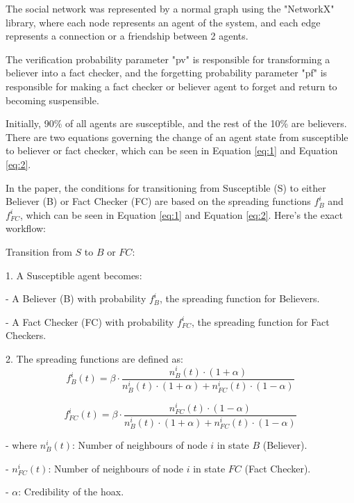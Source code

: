 \documentclass[twocolumn, a4paper, 12pt]{article}
\begin{document}
The social network was represented by a normal graph using the "NetworkX" library, where each node represents an agent of the system, and each edge represents a connection or a friendship between 2 agents.

The verification probability parameter "pv" is responsible for transforming a believer into a fact checker, and the forgetting probability parameter "pf" is responsible for making a fact checker or believer agent to forget and return to becoming suspensible.

Initially, 90\% of all agents are susceptible, and the rest of the 10\% are believers. There are two equations governing the change of an agent state from susceptible to believer or fact checker, which can be seen in Equation \ref{eq:1} and Equation \ref{eq:2}.

In the paper, the conditions for transitioning from Susceptible (S) to either Believer (B) or Fact Checker (FC) are based on the spreading functions $f_B^i$ and $f_{FC}^i$, which can be seen in Equation \ref{eq:1} and Equation \ref{eq:2}. \cite{simulation} Here's the exact workflow:

Transition from $S$ to $B$ or $FC$:

1. A Susceptible agent becomes:

   - A Believer (B) with probability $f_B^i$, the spreading function for Believers.
   
   - A Fact Checker (FC) with probability $f_{FC}^i$, the spreading function for Fact Checkers.

2. The spreading functions are defined as:
   \begin{equation} \label{eq:1}
   f_B^i(t) = \beta \cdot \frac{n_B^i(t) \cdot (1 + \alpha)}{n_B^i(t) \cdot (1 + \alpha) + n_{FC}^i(t) \cdot (1 - \alpha)}
   \end{equation} \cite{simulation}

   \begin{equation} \label{eq:2}
   f_{FC}^i(t) = \beta \cdot \frac{n_{FC}^i(t) \cdot (1 - \alpha)}{n_B^i(t) \cdot (1 + \alpha) + n_{FC}^i(t) \cdot (1 - \alpha)}
   \end{equation} \cite{simulation}
   
   - where $n_B^i(t)$: Number of neighbours of node $i$ in state $B$ (Believer).
   
   - $n_{FC}^i(t)$: Number of neighbours of node $i$ in state $FC$ (Fact Checker).
   
   - $\alpha$: Credibility of the hoax.
   
\end{document}
